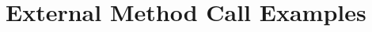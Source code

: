 \documentclass[11pt]{article} %
\theoremstyle{definition}
\begin{document}
%
 
\section{External Method Call Examples}
\end{document}
